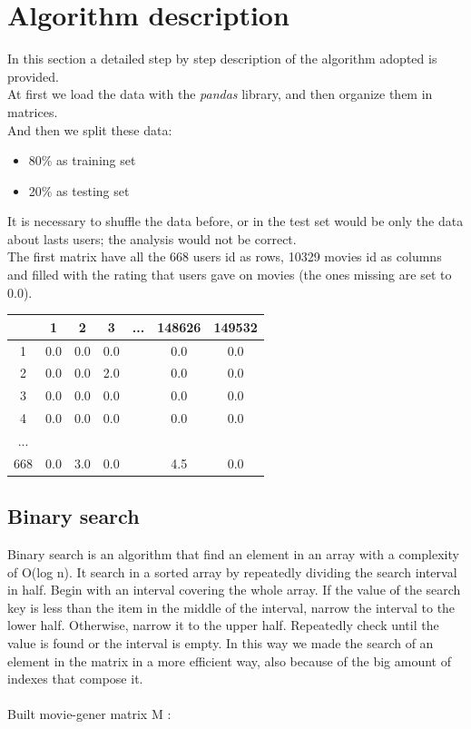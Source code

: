 \documentclass{article}
\begin{document}
\section{Algorithm description}
In this section a detailed step by step description of the algorithm adopted is provided.\\
At first we load the data with the \textsl{pandas} library, and then organize them in matrices.\\
And then we split these data:
\begin{itemize}
      \item 80\% as training set
      \item 20\% as testing set
\end{itemize}
It is necessary to shuffle the data before, or in the test set would be only the data about lasts users; the analysis would not be correct.\\
The first matrix have all the 668 users id as rows, 10329 movies id as columns and filled with the rating that users gave on movies (the ones missing are set to 0.0).\\
\begin{center}
      \begin{tabular}{ | c | c | c | c | c | c | c |} 
        \hline
        \rowcolor{lightgray}  & 1 & 2 & 3 & ... & 148626 & 149532 \\ 
        \hline
         \cellcolor{lightgray}1 & 0.0 & 0.0 & 0.0 &  & 0.0 & 0.0 \\ 
        \hline
        \cellcolor{lightgray}2 & 0.0 & 0.0 & 2.0 &  & 0.0 & 0.0 \\ 
        \hline
        \cellcolor{lightgray}3 & 0.0 & 0.0 & 0.0 &  & 0.0 & 0.0\\
        \hline
        \cellcolor{lightgray}4 & 0.0 & 0.0 & 0.0 &  & 0.0 & 0.0\\
        \hline
        \cellcolor{lightgray}... &  &  &  &  &  & \\ 
        \hline
        \cellcolor{lightgray}668 & 0.0 & 3.0 & 0.0 &  & 4.5 & 0.0\\
        \hline
      \end{tabular}
\end{center}



\subsection{Binary search}
Binary search is an algorithm that find an element in an array with a complexity of O(log n). It search in a sorted array by repeatedly dividing the search interval in half. Begin with an interval covering the whole array. If the value of the search key is less than the item in the middle of the interval, narrow the interval to the lower half. Otherwise, narrow it to the upper half. Repeatedly check until the value is found or the interval is empty.
In this way we made the search of an element in the matrix in a more efficient way, also because of the big amount of indexes that compose it.\\ \\
Built movie-gener matrix M :
\end{document}
